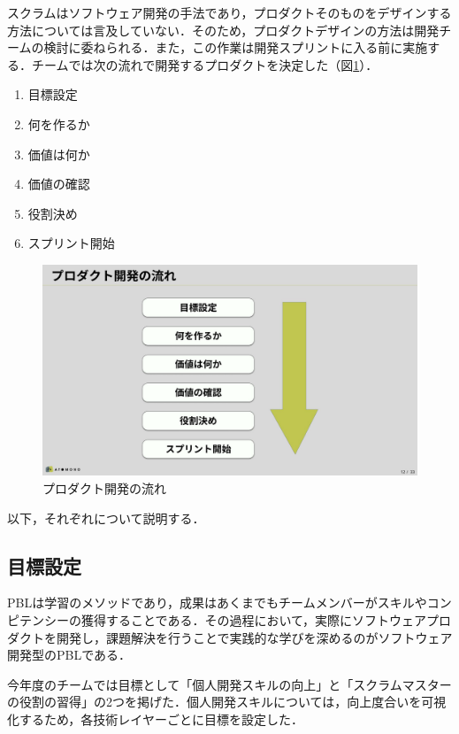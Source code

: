 \documentclass[fontsize=9pt, jafontscale=.95, twocolumn, a4paper]{jlreq}
\begin{document}
スクラムはソフトウェア開発の手法であり，プロダクトそのものをデザインする方法については言及していない．そのため，プロダクトデザインの方法は開発チームの検討に委ねられる．また，この作業は開発スプリントに入る前に実施する．チームでは次の流れで開発するプロダクトを決定した（図\ref{fig:プロダクト開発の流れ}）．

\begin{enumerate}
\item 目標設定
\item 何を作るか
\item 価値は何か
\item 価値の確認
\item 役割決め
\item スプリント開始
\end{enumerate}

\begin{figure}[tb]
\centering
\includegraphics[width=.9\linewidth]{./images/前期発表資料_ページ_12.png}
\caption{\label{fig:プロダクト開発の流れ}プロダクト開発の流れ}
\end{figure}

以下，それぞれについて説明する．

\subsection{目標設定}
\label{sec:org3653438}

PBLは学習のメソッドであり，成果はあくまでもチームメンバーがスキルやコンピテンシーの獲得することである．その過程において，実際にソフトウェアプロダクトを開発し，課題解決を行うことで実践的な学びを深めるのがソフトウェア開発型のPBLである．

今年度のチームでは目標として「個人開発スキルの向上」と「スクラムマスターの役割の習得」の2つを掲げた．個人開発スキルについては，向上度合いを可視化するため，各技術レイヤーごとに目標を設定した．
\end{document}
